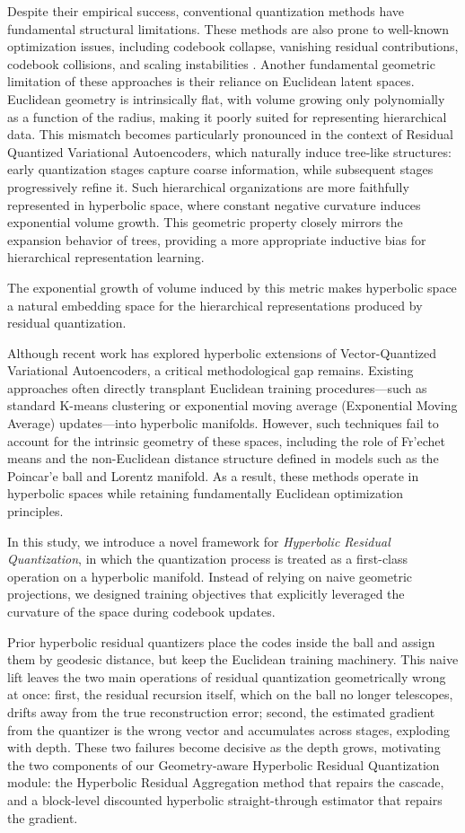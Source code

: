 \documentclass[12pt]{report}
\begin{document}
Despite their empirical success, conventional quantization methods have fundamental structural limitations. These methods are also prone to well-known optimization issues, including codebook collapse, vanishing residual contributions, codebook collisions, and scaling instabilities \cite{collapse_1}.
Another fundamental geometric limitation of these approaches is their reliance on Euclidean latent spaces. Euclidean geometry is intrinsically flat, with volume growing only polynomially as a function of the radius, making it poorly suited for representing hierarchical data. This mismatch becomes particularly pronounced in the context of Residual Quantized Variational Autoencoders, which naturally induce tree-like structures: early quantization stages capture coarse information, while subsequent stages progressively refine it. Such hierarchical organizations are more faithfully represented in hyperbolic space, where constant negative curvature induces exponential volume growth. This geometric property closely mirrors the expansion behavior of trees, providing a more appropriate inductive bias for hierarchical representation learning.

The exponential growth of volume induced by this metric makes hyperbolic space a natural embedding space for the hierarchical representations produced by residual quantization.

Although recent work has explored hyperbolic extensions of Vector-Quantized Variational Autoencoders, a critical methodological gap remains. Existing approaches often directly transplant Euclidean training procedures—such as standard K-means clustering or exponential moving average (Exponential Moving Average) updates—into hyperbolic manifolds. However, such techniques fail to account for the intrinsic geometry of these spaces, including the role of Fr'echet means and the non-Euclidean distance structure defined in models such as the Poincar'e ball and Lorentz manifold. As a result, these methods operate in hyperbolic spaces while retaining fundamentally Euclidean optimization principles.


In this study, we introduce a novel framework for \emph{Hyperbolic Residual Quantization}, in which the quantization process is treated as a first-class operation on a hyperbolic manifold. Instead of relying on naive geometric projections, we designed training objectives that explicitly leveraged the curvature of the space during codebook updates.

Prior hyperbolic residual quantizers place the codes inside the ball and assign them by geodesic distance, but keep the Euclidean training machinery. This naive lift leaves the two main operations of residual quantization geometrically wrong at once: first, the residual recursion itself, which on the ball no longer telescopes, drifts away from the true reconstruction error; second, the estimated gradient from the quantizer is the wrong vector and accumulates across stages, exploding with depth. These two failures become decisive as the depth grows, motivating the two components of our Geometry-aware Hyperbolic Residual Quantization module: the Hyperbolic Residual Aggregation method that repairs the cascade, and a block-level discounted hyperbolic straight-through estimator that repairs the gradient.
\end{document}
